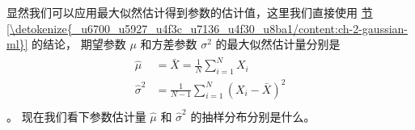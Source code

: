 \documentclass[letterpaper,10pt,english]{sphinxmanual}
\begin{document}
显然我们可以应用最大似然估计得到参数的估计值，这里我们直接使用 \hyperref[\detokenize{_u6700_u5927_u4f3c_u7136_u4f30_u8ba1/content:ch-2-gaussian-ml}]{节 \ref{\detokenize{_u6700_u5927_u4f3c_u7136_u4f30_u8ba1/content:ch-2-gaussian-ml}}} 的结论，
期望参数 \(\mu\) 和方差参数 \(\sigma^2\) 的最大似然估计量分别是
\begin{align}\label{equation:推断与检验/content:eq_estimator_eval_014}\!\begin{aligned}
\hat{\mu} &= \bar{X} = \frac{1}{N} \sum_{i=1}^N X_i\\
\hat{\sigma}^2 &= \frac{1}{N-1} \sum_{i=1}^N (X_i-\bar{X})^2\\
\end{aligned}\end{align}
。
现在我们看下参数估计量 \(\hat{\mu}\) 和 \(\hat{\sigma}^2\)
的抽样分布分别是什么。
\end{document}
